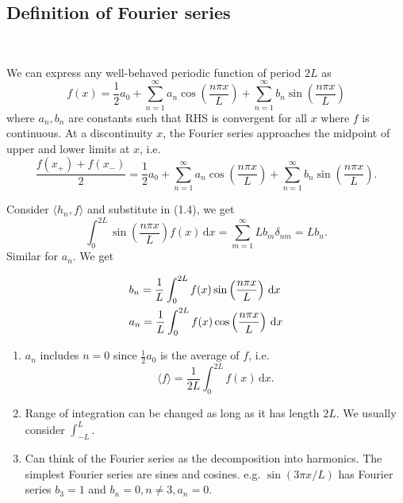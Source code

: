 \documentclass[a4paper]{article}
\begin{document}
\subsection{Definition of Fourier series}
\ \vspace{-1.5em}
\begin{definition}
    We can express any well-behaved periodic function of period $2L$ as 
\begin{equation}\label{1.eq.4:FS}
    f(x) = \frac{1}{2}a_0 + \sum_{n=1}^{\infty} a_n \cos \left( \frac{n\pi x}{L} \right)+ \sum_{n=1}^{\infty} b_n \sin \left( \frac{n\pi x}{L} \right)
\end{equation}
where $a_n,b_n$ are constants such that RHS is convergent for all $x$ where $f$ is continuous. At a discontinuity $x$, the Fourier series approaches the midpoint of upper and lower limits at $x$, i.e. 
\[
    \frac{f(x_+)+f(x_-)}{2} = \frac{1}{2}a_0 + \sum_{n=1}^{\infty} a_n \cos \left( \frac{n\pi x}{L} \right)+ \sum_{n=1}^{\infty} b_n \sin \left( \frac{n\pi x}{L} \right).
\]
\end{definition}
Consider $ \langle h_n,f \rangle  $ and substitute in (1.4), we get 
\[
    \int_{0}^{2L} \sin \left( \frac{n \pi x}{L} \right) f(x) \,\mathrm{d}x = \sum_{m=1}^{\infty}Lb_m \delta_{nm} = Lb_n.
\]
Similar for $a_n$. We get
\begin{proposition}
    \begin{equation}
        \begin{aligned}
            &b_{n}=\frac{1}{L} \int_{0}^{2 L} f(x) \sin \left(\frac{n \pi x}{L}\right)\, \mathrm{d} x\\ &a_n = \frac{1}{L}\int_{0}^{2L} f(x) \cos \left( \frac{n \pi x}{L} \right) \,\mathrm{d}x
        \end{aligned}
    \end{equation}
\end{proposition}
\begin{note}
    \begin{enumerate}
        \item $a_n$ includes $n=0$ since $ \frac{1}{2}a_0 $ is the average of $f$, i.e.
        \[
            \langle f \rangle = \frac{1}{2L}\int_{0}^{2L} f(x) \,\mathrm{d}x.
        \]
        \item Range of integration can be changed as long as it has length $2L$. We usually consider $ \int_{-L}^{L} $.
        \item Can think of the Fourier series as the decomposition into harmonics. The simplest Fourier series are sines and cosines. e.g. $ \sin (3 \pi x/ L) $ has Fourier series $b_3=1$ and $ b_n=0,n\neq 3 ,a_n=0$.
    \end{enumerate}
\end{note}
\end{document}
